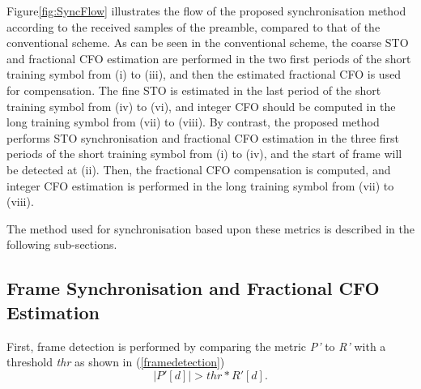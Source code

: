 Figure\ref{fig:SyncFlow} illustrates the flow of the proposed synchronisation method according to the received samples of the preamble, compared to that of the conventional scheme.
As can be seen in the conventional scheme, the coarse STO and fractional CFO estimation are performed in the two first periods of the short training symbol from (i) to (iii), and then the estimated fractional CFO is used for compensation.
The fine STO is estimated in the last period of the short training symbol from (iv) to (vi), and integer CFO should be computed in the long training symbol from (vii) to (viii).
By contrast, the proposed method performs STO synchronisation and fractional CFO estimation in the three first periods of the short training symbol from (i) to (iv), and the start of frame will be detected at (ii).
Then, the fractional CFO compensation is computed, and integer CFO estimation is performed in the long training symbol from (vii) to (viii).

The method used for synchronisation based upon these metrics is described in the following sub-sections.

\subsection{Frame Synchronisation and Fractional CFO Estimation}

First, frame detection is performed by comparing the metric \emph{P'} to \emph{R'} with a threshold \emph{thr} as shown in (\ref{framedetection})
\begin{equation}
\label{framedetection}
|P'[d]| > thr * R'[d].
\end{equation}

